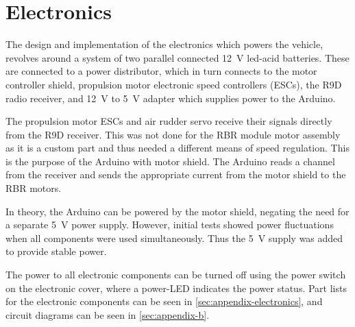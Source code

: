\section{Electronics}

The design and implementation of the electronics which powers the vehicle, revolves around a system of two parallel connected 12~V led-acid batteries. These are connected to a power distributor, which in turn connects to the motor controller shield, propulsion
motor electronic speed controllers (ESCs), the R9D radio receiver,
and 12~V to 5~V adapter which supplies power to the Arduino.

The propulsion motor ESCs and air rudder servo receive their signals directly from the R9D receiver. This was not done for the RBR module motor assembly as it is a custom part and thus needed a different means of speed regulation. This is the purpose of the Arduino with motor shield. The Arduino reads a channel from the receiver and sends the appropriate current from the motor shield to the RBR motors.

In theory, the Arduino can be powered by the motor shield, negating the need for a separate 5~V power supply. However, initial tests showed power fluctuations when all components
were used simultaneously. Thus the 5~V supply was added to provide stable power.

The power to all electronic components can be turned off using the power switch on the electronic cover, where a power-LED indicates the power status. Part lists for the electronic components can be seen in \cref{sec:appendix-electronics},
and circuit diagrams can be seen in \cref{sec:appendix-b}.